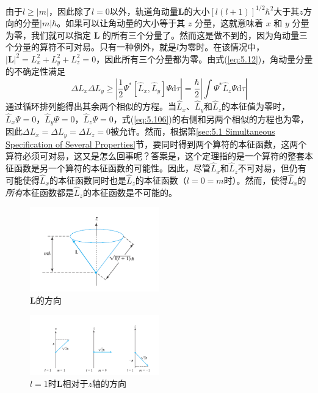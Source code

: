     由于$l \ge \left|m\right|$，因此除了$l=0$以外，轨道角动量$\mathbf{L}$的大小$\left[l\left(l+1\right)\right]^{1/2}\hbar^2$大于其$z$方向的分量$\left|m\right|\hbar$。如果可以让角动量的大小等于其 $z$ 分量，这就意味着 $x$ 和 $y$ 分量为零，我们就可以指定 $\mathbf{L}$ 的所有三个分量了。然而这是做不到的，因为角动量三个分量的算符不可对易。只有一种例外，就是$l$为零时。在该情况中，$\left|\mathbf{L}\right|^2 = L_x^2+ L_y^2 + L_z^2 = 0$，因此所有三个分量都为零。由式(\ref{eq:5.12})，角动量分量的不确定性满足
    \begin{equation}
        \Delta L_x\Delta L_y \ge \left|\frac{1}{2}\Psi^{\ast}\left[\hat{L}_x,\hat{L}_y\right]\Psi\mathrm{d}\tau\right| = \frac{\hbar}{2}\left|\int \Psi^{\ast}\hat{L}_z\Psi\mathrm{d}\tau\right|
        \label{eq:5.106}
    \end{equation}
    通过循环排列能得出其余两个相似的方程。当$\hat{L}_x$、$\hat{L}_y$和$\hat{L}_z$的本征值为零时，$\hat{L}_x\Psi = 0$，$\hat{L}_y\Psi = 0$，$\hat{L}_z\Psi = 0$，式(\ref{eq:5.106})的右侧和另两个相似的方程也为零，因此$\Delta L_x = \Delta L_y = \Delta L_z = 0$被允许。然而，根据第\ref{sec:5.1 Simultaneous Specification of Several Properties}节，要同时得到两个算符的本征函数，这两个算符必须可对易，这又是怎么回事呢？答案是，这个定理指的是一个算符的整套本征函数是另一个算符的本征函数的可能性。因此，尽管$\hat{L}_x$和$\hat{L}_z$不可对易，但仍有可能使得$\hat{L}_x$的本征函数同时也是$\hat{L}_z$的本征函数（$l=0=m$时）。然而，使得$\hat{L}_x$的\textit{所有}本征函数都是$\hat{L}_z$的本征函数是不可能的。
    \begin{figure}[ht]
        \centering
        \includegraphics[width=0.5\textwidth]{Figures/5.6.png}
        \caption{$\mathbf{L}$的方向}
        \label{fig:5.6}
    \end{figure}
    \begin{figure}
        \centering
        \includegraphics[width=0.5\textwidth]{Figures/5.7.png}
        \caption{$l=1$时$\mathbf{L}$相对于$z$轴的方向}
        \label{fig:5.7}
    \end{figure}

